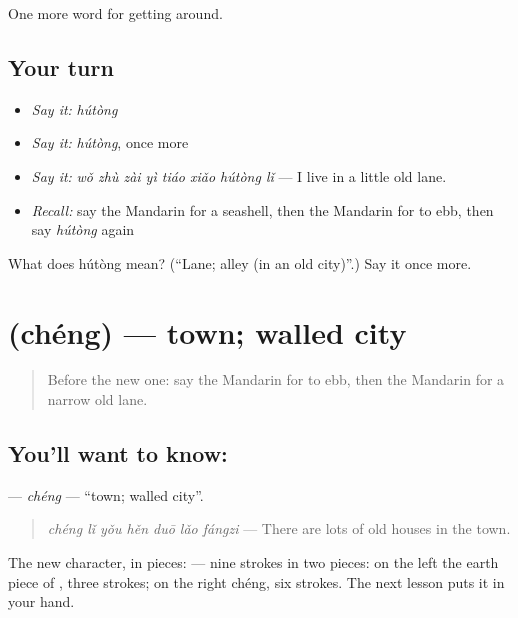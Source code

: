 \begin{grammarlens}[title={What you've built}]
One more word for getting around.
\end{grammarlens}

\subsection*{Your turn}
\begin{itemize}
\raggedright
  \item \emph{Say it:} \emph{hútòng}
  \item \emph{Say it:} \emph{hútòng}, once more
  \item \emph{Say it:} \emph{wǒ zhù zài yì tiáo xiǎo hútòng lǐ} — I live in a little old lane.
  \item \emph{Recall:} say the Mandarin for a seashell, then the Mandarin for to ebb, then say \emph{hútòng} again
\end{itemize}

\begin{tcolorbox}[breakable,colback=teal!4,colframe=teal!35!black,title={Before you move on}]
What does hútòng mean? (\textquotedblleft{}Lane; alley (in an old city)\textquotedblright{}.) Say it once more.
\end{tcolorbox}
\section[\texorpdfstring{\zh{城} (chéng)}{城 (chéng)}]{ (chéng) — town; walled city}

\label{lesson:ZH-C446-cheng}



\begin{quote}
Before the new one: say the Mandarin for to ebb, then the Mandarin for a narrow old lane.
\end{quote}

\subsection*{You'll want to know: }
\textbf{} — \emph{chéng} — \textquotedblleft{}town; walled city\textquotedblright{}.

\begin{quote}
\textbf{} \emph{chéng lǐ yǒu hěn duō lǎo fángzi} — There are lots of old houses in the town.
\end{quote}

The new character, in pieces:  — nine strokes in two pieces: on the left the earth piece of , three strokes; on the right  chéng, six strokes. The next lesson puts it in your hand.

